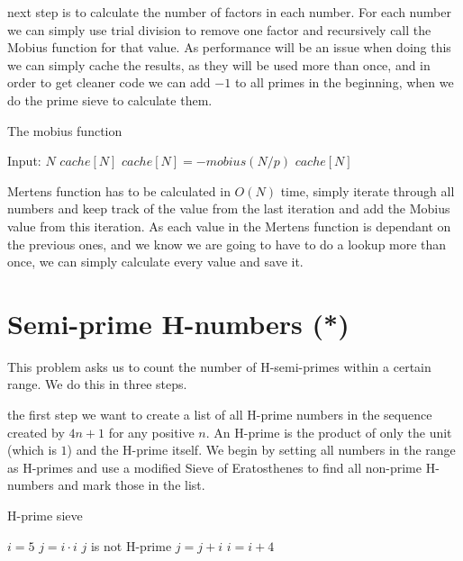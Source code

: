 \documentclass[11pt,a4paper,twoside]{article}
\begin{document}
 next step is to calculate the number of factors in each number.
For each number we can simply use trial division to remove one factor and
recursively call the Mobius function for that value. As performance will be an
issue when doing this we can simply cache the results, as they will be used
more than once, and in order to get cleaner code we can add $-1$ to all primes
in the beginning, when we do the prime sieve to calculate them.

\begin{algorithm}
    \label{mobius}
    \caption{The mobius function}
    \begin{algorithmic}
        \REQUIRE Input: $N$
            \RETURN $cache[N]$
        \ENDIF
                \STATE $cache[N] = - mobius(N/p)$
                \RETURN $cache[N]$
            \ENDIF
        \ENDFOR
    \end{algorithmic}
\end{algorithm}

 Mertens function has to be calculated in $O(N)$ time, simply
iterate through all numbers and keep track of the value from the last iteration
and add the Mobius value from this iteration. As each value in the Mertens
function is dependant on the previous ones, and we know we are going to have to
do a lookup more than once, we can simply calculate every value and save it.


\section{Semi-prime H-numbers (*)}

This problem asks us to count the number of H-semi-primes within a certain 
range. We do this in three steps.

 the first step we want to create a list of all H-prime numbers in
the sequence created by $4n + 1$ for any positive $n$. An H-prime is the
product of only the unit (which is $1$) and the H-prime itself. We begin by
setting all numbers in the range as H-primes and use a modified Sieve of
Eratosthenes to find all non-prime H-numbers and mark those in the list.

\begin{algorithm}
    \caption{H-prime sieve}
    \label{lst:hsieve}
    \begin{algorithmic}
        \STATE $i = 5$
                \STATE $j = i \cdot i$
                    \STATE $j$ is not H-prime %
                    \STATE $j = j + i$
                \ENDWHILE
            \ENDIF
            \STATE $i = i + 4$
        \ENDWHILE
    \end{algorithmic}
\end{algorithm}
\end{document}
